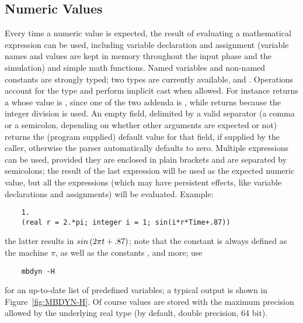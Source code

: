 \subsection{Numeric Values}
Every time a numeric value is expected, the result of evaluating 
a mathematical expression can be used, including variable declaration 
and assignment (variable names and values are kept in memory throughout
the input phase and the simulation) and simple math functions.
Named variables and non-named constants are strongly typed; two types are
currently available,  and .
Operations account for the type and perform implicit cast when allowed.
For instance  returns a  whose value 
is , since one of the 
two addenda is , while  returns  because 
the integer division is used.
An empty field, delimited by a valid separator (a comma or a semicolon,
depending on whether other arguments are expected or not) returns the
(program supplied) default value for that field, if supplied by the caller, 
otherwise the parser automatically defaults to zero.
Multiple expressions can be used, provided they are enclosed in plain 
brackets and are separated by semicolons; the result 
of the last expression will be used as the expected numeric value,
but all the expressions (which may have persistent effects, 
like variable declarations and assignments) will be evaluated.
Example:
\begin{verbatim}
    1.
    (real r = 2.*pi; integer i = 1; sin(i*r*Time+.87))      
\end{verbatim}
the latter results in $ sin\left( 2\pi{t}+.87 \right) $; 
note that the constant  is always defined
as the machine $ \pi $, as well as the constants ,
 and more; use
\begin{verbatim}
    mbdyn -H
\end{verbatim}
for an up-to-date list of predefined variables; a typical output
is shown in Figure~\ref{fig:MBDYN-H}.
Of course values are stored with the maximum precision allowed
by the underlying real type (by default, double precision, 64 bit).

